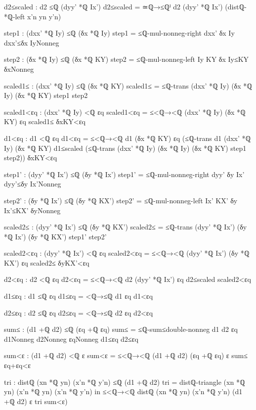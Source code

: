 \documentclass[11pt,a4paper]{book}
\begin{document}
\begin{code}
{          d2≤scaled : d2 ≤ℚ (dyy' *ℚ Ix')
          d2≤scaled = ≃ℚ→≤ℚˡ {d2} {(dyy' *ℚ Ix')} (distℚ-*ℚ-left x'n yn y'n)

          step1 : (dxx' *ℚ Iy) ≤ℚ (δx *ℚ Iy)
          step1 = ≤ℚ-mul-nonneg-right dxx' δx Iy dxx'≤δx IyNonneg

          step2 : (δx *ℚ Iy) ≤ℚ (δx *ℚ KY)
          step2 = ≤ℚ-mul-nonneg-left Iy KY δx Iy≤KY δxNonneg

          scaled1≤ : (dxx' *ℚ Iy) ≤ℚ (δx *ℚ KY)
          scaled1≤ = ≤ℚ-trans {(dxx' *ℚ Iy)} {(δx *ℚ Iy)} {(δx *ℚ KY)} step1 step2

          scaled1<εq : (dxx' *ℚ Iy) <ℚ εq
          scaled1<εq = ≤<ℚ→<ℚ {(dxx' *ℚ Iy)} {(δx *ℚ KY)} {εq} scaled1≤ δxKY<εq

          d1<εq : d1 <ℚ εq
          d1<εq = ≤<ℚ→<ℚ {d1} {(δx *ℚ KY)} {εq} (≤ℚ-trans {d1} {(dxx' *ℚ Iy)} {(δx *ℚ KY)} d1≤scaled (≤ℚ-trans {(dxx' *ℚ Iy)} {(δx *ℚ Iy)} {(δx *ℚ KY)} step1 step2)) δxKY<εq

          step1' : (dyy' *ℚ Ix') ≤ℚ (δy *ℚ Ix')
          step1' = ≤ℚ-mul-nonneg-right dyy' δy Ix' dyy'≤δy Ix'Nonneg

          step2' : (δy *ℚ Ix') ≤ℚ (δy *ℚ KX')
          step2' = ≤ℚ-mul-nonneg-left Ix' KX' δy Ix'≤KX' δyNonneg

          scaled2≤ : (dyy' *ℚ Ix') ≤ℚ (δy *ℚ KX')
          scaled2≤ = ≤ℚ-trans {(dyy' *ℚ Ix')} {(δy *ℚ Ix')} {(δy *ℚ KX')} step1' step2'

          scaled2<εq : (dyy' *ℚ Ix') <ℚ εq
          scaled2<εq = ≤<ℚ→<ℚ {(dyy' *ℚ Ix')} {(δy *ℚ KX')} {εq} scaled2≤ δyKX'<εq

          d2<εq : d2 <ℚ εq
          d2<εq = ≤<ℚ→<ℚ {d2} {(dyy' *ℚ Ix')} {εq} d2≤scaled scaled2<εq

          d1≤εq : d1 ≤ℚ εq
          d1≤εq = <ℚ→≤ℚ {d1} {εq} d1<εq

          d2≤εq : d2 ≤ℚ εq
          d2≤εq = <ℚ→≤ℚ {d2} {εq} d2<εq

          sum≤ : (d1 +ℚ d2) ≤ℚ (εq +ℚ εq)
          sum≤ = ≤ℚ-sum≤double-nonneg d1 d2 εq d1Nonneg d2Nonneg εqNonneg d1≤εq d2≤εq

          sum<ε : (d1 +ℚ d2) <ℚ ε
          sum<ε = ≤<ℚ→<ℚ {(d1 +ℚ d2)} {(εq +ℚ εq)} {ε} sum≤ εq+εq<ε

          tri : distℚ (xn *ℚ yn) (x'n *ℚ y'n) ≤ℚ (d1 +ℚ d2)
          tri = distℚ-triangle (xn *ℚ yn) (x'n *ℚ yn) (x'n *ℚ y'n)
        in
        ≤<ℚ→<ℚ {distℚ (xn *ℚ yn) (x'n *ℚ y'n)} {(d1 +ℚ d2)} {ε} tri sum<ε)
  }
\end{code}
\end{document}
